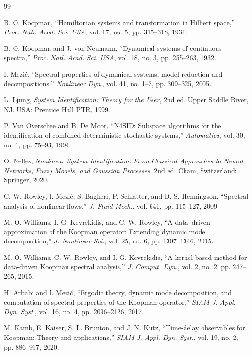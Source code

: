 ﻿\documentclass[journal]{IEEEtran}
\begin{document}
\begin{thebibliography}{99}

B. O. Koopman, ``Hamiltonian systems and transformation in Hilbert space,'' \emph{Proc. Natl. Acad. Sci. USA}, vol. 17, no. 5, pp. 315--318, 1931.

B. O. Koopman and J. von Neumann, ``Dynamical systems of continuous spectra,'' \emph{Proc. Natl. Acad. Sci. USA}, vol. 18, no. 3, pp. 255--263, 1932.

I. Mezi\'c, ``Spectral properties of dynamical systems, model reduction and decompositions,'' \emph{Nonlinear Dyn.}, vol. 41, no. 1--3, pp. 309--325, 2005.

L. Ljung, \emph{System Identification: Theory for the User}, 2nd ed. Upper Saddle River, NJ, USA: Prentice Hall PTR, 1999.

P. Van Overschee and B. De Moor, ``N4SID: Subspace algorithms for the identification of combined deterministic-stochastic systems,'' \emph{Automatica}, vol. 30, no. 1, pp. 75--93, 1994.

O. Nelles, \emph{Nonlinear System Identification: From Classical Approaches to Neural Networks, Fuzzy Models, and Gaussian Processes}, 2nd ed. Cham, Switzerland: Springer, 2020.

C. W. Rowley, I. Mezi\'c, S. Bagheri, P. Schlatter, and D. S. Henningson, ``Spectral analysis of nonlinear flows,'' \emph{J. Fluid Mech.}, vol. 641, pp. 115--127, 2009.

M. O. Williams, I. G. Kevrekidis, and C. W. Rowley, ``A data--driven approximation of the Koopman operator: Extending dynamic mode decomposition,'' \emph{J. Nonlinear Sci.}, vol. 25, no. 6, pp. 1307--1346, 2015.

M. O. Williams, C. W. Rowley, and I. G. Kevrekidis, ``A kernel-based method for data-driven Koopman spectral analysis,'' \emph{J. Comput. Dyn.}, vol. 2, no. 2, pp. 247--265, 2015.

H. Arbabi and I. Mezi\'c, ``Ergodic theory, dynamic mode decomposition, and computation of spectral properties of the Koopman operator,'' \emph{SIAM J. Appl. Dyn. Syst.}, vol. 16, no. 4, pp. 2096--2126, 2017.

M. Kamb, E. Kaiser, S. L. Brunton, and J. N. Kutz, ``Time-delay observables for Koopman: Theory and applications,'' \emph{SIAM J. Appl. Dyn. Syst.}, vol. 19, no. 2, pp. 886--917, 2020.


\end{thebibliography}
\end{document}
